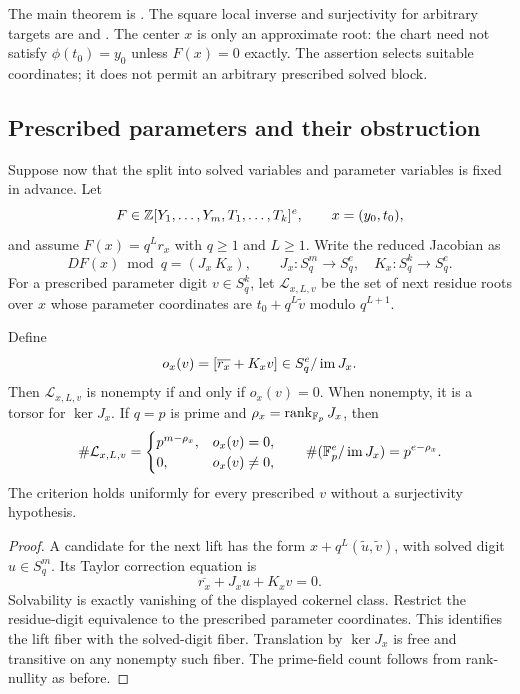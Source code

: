 The main theorem is
.
The square local inverse and surjectivity for arbitrary targets are
 and
.
The center $x$ is only an approximate root: the chart need not satisfy
$\phi(t_0)=y_0$ unless $F(x)=0$ exactly. The assertion selects suitable
coordinates; it does not permit an arbitrary prescribed solved block.

\subsection{Prescribed parameters and their obstruction}

Suppose now that the split into solved variables and parameter variables
is fixed in advance. Let
\[
 F\in\mathbb Z[Y_1,\ldots,Y_m,T_1,\ldots,T_k]^e,\qquad x=(y_0,t_0),
\]
and assume $F(x)=q^Lr_x$ with $q\ge1$ and $L\ge1$. Write the reduced
Jacobian as
\[
 DF(x)\bmod q=(J_x\ K_x),\qquad
 J_x:S_q^m\to S_q^e,\quad K_x:S_q^k\to S_q^e.
\]
For a prescribed parameter digit $v\in S_q^k$, let $\mathcal L_{x,L,v}$
be the set of next residue roots over $x$ whose parameter coordinates are
$t_0+q^L\widetilde v$ modulo $q^{L+1}$.

\begin{theorem}
\label{thm:prescribed-obstruction}
Define
\[
 o_x(v)=[\overline{r_x}+K_xv]\in S_q^e/\operatorname{im} J_x.
\]
Then $\mathcal L_{x,L,v}$ is nonempty if and only if $o_x(v)=0$.
When nonempty, it is a torsor for $\ker J_x$. If $q=p$ is prime and
$\rho_x=\operatorname{rank}_{\mathbb F_p}J_x$, then
\begin{equation}\label{eq:prescribed-count}
 \#\mathcal L_{x,L,v}
 =\begin{cases}p^{m-\rho_x},&o_x(v)=0,\\0,&o_x(v)\ne0,\end{cases}
 \qquad \#(\mathbb F_p^e/\operatorname{im} J_x)=p^{e-\rho_x}.
\end{equation}
The criterion holds uniformly for every prescribed $v$ without a
surjectivity hypothesis.
\end{theorem}

\begin{proof}
A candidate for the next lift has the form
$x+q^L(\widetilde u,\widetilde v)$, with solved digit $u\in S_q^m$.
Its Taylor correction equation is
\[
 \overline{r_x}+J_xu+K_xv=0.
\]
Solvability is exactly vanishing of the displayed cokernel class. Restrict
the residue-digit equivalence to the prescribed parameter coordinates.
This identifies the lift fiber with the solved-digit fiber.
Translation by $\ker J_x$ is free and transitive on any nonempty such
fiber. The prime-field count follows from rank-nullity as before.
\end{proof}

